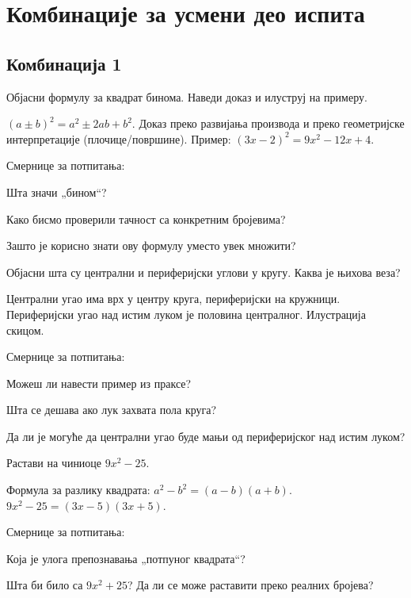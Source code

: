 \documentclass[12pt]{exam}
\begin{document}
\ifprintanswers\else
\section*{Комбинације за усмени део испита}
\fi

\subsection*{Комбинација 1}
\begin{questions}
\question Објасни формулу за квадрат бинома. Наведи доказ и илуструј на примеру.
\begin{solution}
$(a\pm b)^2=a^2\pm 2ab+b^2$.  
Доказ преко развијања производа и преко геометријске интерпретације (плочице/површине).  
Пример: $(3x-2)^2=9x^2-12x+4$.

Смернице за потпитања:
  \par Шта значи „бином“? 
  \par Како бисмо проверили тачност са конкретним бројевима?
  \par Зашто је корисно знати ову формулу уместо увек множити?
\end{solution}

\question Објасни шта су централни и периферијски углови у кругу. Каква је њихова веза?
\begin{solution}
Централни угао има врх у центру круга, периферијски на кружници.  
Периферијски угао над истим луком је половина централног.  
Илустрација скицом.

Смернице за потпитања:
  \par Можеш ли навести пример из праксе? 
  \par Шта се дешава ако лук захвата пола круга?
  \par Да ли је могуће да централни угао буде мањи од периферијског над истим луком?
\end{solution}

\question Растави на чиниоце $9x^2-25$.
\begin{solution}
Формула за разлику квадрата: $a^2-b^2=(a-b)(a+b)$.  
$9x^2-25=(3x-5)(3x+5)$.

Смернице за потпитања:
  \par Која је улога препознавања „потпуног квадрата“?
  \par Шта би било са $9x^2+25$? Да ли се може раставити преко реалних бројева?
\end{solution}
\end{questions}
\end{document}
